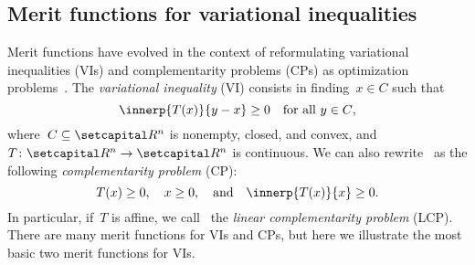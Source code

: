 \documentclass[../../main]{subfiles}
\begin{document}
\subsection{Merit functions for variational inequalities}
Merit functions have evolved in the context of reformulating variational inequalities (VIs) and complementarity problems (CPs) as optimization problems~\cite{Fukushima1996}.
The \emph{variational inequality} (VI) consists in finding~$x \in C$ such that
\begin{equation} \label{eq:VI}
    \innerp{T(x)}{y - x} \ge 0 \forallcondition{y \in C}
,\end{equation} 
where~$C \subseteq \setR^n$ is nonempty, closed, and convex, and~$T \colon \setR^n \to \setR^n$ is continuous.
We can also rewrite~ as the following \emph{complementarity problem} (CP):
\begin{equation} \label{eq:CP}
    T(x) \ge 0, \quad x \ge 0, \eqand \innerp{T(x)}{x} \ge 0
.\end{equation} 
In particular, if~$T$ is affine, we call~ the \emph{linear complementarity problem} (LCP).
There are many merit functions for VIs and CPs, but here we illustrate the most basic two merit functions for VIs.
\end{document}
